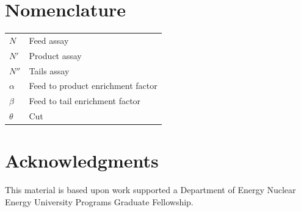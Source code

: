 \documentclass{anstrans}
\begin{document}
\section{Nomenclature}

\begin{table}[H]
    \centering
    \begin{tabular}{l|l}
        $N$ & Feed assay \\
        $N'$ & Product assay \\
        $N''$ & Tails assay \\
        $\alpha$ & Feed to product enrichment factor \\
        $\beta$ & Feed to tail enrichment factor \\
        $\theta$ & Cut
    \end{tabular}
    \label{tab:my_label}
\end{table}

\section{Acknowledgments}
This material is based upon work supported a Department of Energy Nuclear
Energy University Programs Graduate Fellowship.



\end{document}
